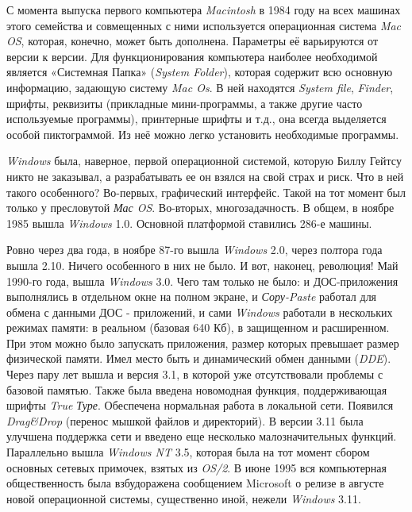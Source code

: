 С момента выпуска первого компьютера \textit{Macintosh} в 1984 году на всех машинах этого семейства и совмещенных с ними используется операционная система \textit{Mac OS}, которая, конечно, может быть дополнена. Параметры её варьируются от версии к версии. Для функционирования компьютера наиболее необходимой является «Системная Папка» (\textit{System Folder}), которая содержит всю основную информацию, задающую систему \textit{Mac Os}. В ней находятся \textit{System file}, \textit{Finder}, шрифты, реквизиты (прикладные мини-программы, а также другие часто используемые программы), принтерные шрифты и т.д., она всегда выделяется особой пиктограммой. Из неё можно легко установить необходимые программы.



\textit{Windows} была, наверное, первой операционной системой, которую Биллу Гейтсу никто не заказывал, а разрабатывать ее он взялся на свой страх и риск. Что в ней такого особенного? Во-первых, графический интерфейс. Такой на тот момент был только у пресловутой \textit{Мас OS}. Во-вторых, многозадачность. В общем, в ноябре 1985 вышла \textit{Windows} 1.0. Основной платформой ставились 286-е машины.

Ровно через два года, в ноябре 87-го вышла \textit{Windows} 2.0, через полтора года вышла 2.10. Ничего особенного в них не было. И вот, наконец, революция! Май 1990-го года, вышла \textit{Windows} 3.0. Чего там только не было: и ДОС-приложения выполнялись в отдельном окне на полном экране, и \textit{Сору-Paste} работал для обмена с данными ДОС - приложений, и сами \textit{Windows} работали в нескольких режимах памяти: в реальном (базовая 640 Кб), в защищенном и расширенном. При этом можно было запускать приложения, размер которых превышает размер физической памяти. Имел место быть и динамический обмен данными (\textit{DDE}). Через пару лет вышла и версия 3.1, в которой уже отсутствовали проблемы с базовой памятью. Также была введена новомодная функция, поддерживающая шрифты \textit{True Туре}. Обеспечена нормальная работа в локальной сети. Появился \textit{Drag\&Drop} (перенос мышкой файлов и директорий). В версии 3.11 была улучшена поддержка сети и введено еще несколько малозначительных функций. Параллельно вышла \textit{Windows NT} 3.5, которая была на тот момент сбором основных сетевых примочек, взятых из \textit{OS/2}. В июне 1995 вся компьютерная общественность была взбудоражена сообщением Microsoft о релизе в августе новой операционной системы, существенно иной, нежели \textit{Windows} 3.11.

